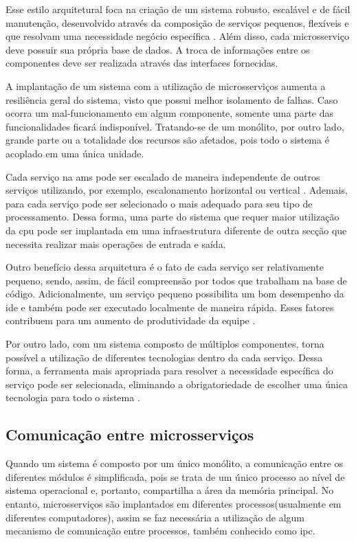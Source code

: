 Esse estilo arquitetural foca na criação de um sistema robusto, escalável e de fácil manutenção, desenvolvido através da composição de serviços pequenos, flexíveis e que resolvam uma necessidade negócio específica \cite{buildingMicroservices}. Além disso, cada microsserviço deve possuir sua própria base de dados. A troca de informações entre os componentes deve ser realizada através das interfaces fornecidas.

A implantação de um sistema com a utilização de microsserviços aumenta a resiliência geral do sistema, visto que possui melhor isolamento de falhas. Caso ocorra um mal-funcionamento em algum componente, somente uma parte das funcionalidades ficará indisponível. Tratando-se de um monólito, por outro lado, grande parte ou a totalidade dos recursos são afetados, pois todo o sistema é acoplado em uma única unidade.

Cada serviço na \acrshort{ams} pode ser escalado de maneira independente de outros serviços utilizando, por exemplo, escalonamento horizontal ou vertical \cite{richardson2018microservices}. Ademais, para cada serviço pode ser selecionado o  mais adequado para seu tipo de processamento. Dessa forma, uma parte do sistema que requer maior utilização da \acrshort{cpu} pode ser implantada em uma infraestrutura diferente de outra secção que necessita realizar mais operações de entrada e saída.

Outro benefício dessa arquitetura é o fato de cada serviço ser relativamente pequeno, sendo, assim, de fácil compreensão por todos que trabalham na base de código. Adicionalmente, um serviço pequeno possibilita um bom desempenho da \acrshort{ide} e também pode ser executado localmente de maneira rápida. Esses fatores contribuem para um aumento de produtividade da equipe \cite{richardson2018microservices}.

Por outro lado, com um sistema composto de múltiplos componentes, torna possível a utilização de diferentes tecnologias dentro da cada serviço. Dessa forma, a ferramenta mais apropriada para resolver a necessidade específica do serviço pode ser selecionada, eliminando a obrigatoriedade de escolher uma única tecnologia para todo o sistema \cite{buildingMicroservices}.

\subsection{Comunicação entre microsserviços}
Quando um sistema é composto por um único monólito, a comunicação entre os diferentes módulos é simplificada, pois se trata de um único processo ao nível de sistema operacional e, portanto, compartilha a área da memória principal. No entanto, microsserviços são implantados em diferentes processos(usualmente em diferentes computadores), assim se faz necessária a utilização de algum mecanismo de comunicação entre processos, também conhecido como \acrfull{ipc}.

